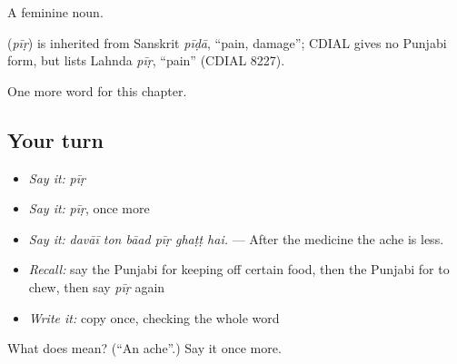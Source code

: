 A feminine noun.

\begin{cousinweb}
\textbf{} (\emph{pīṛ}) is inherited from Sanskrit \emph{pīḍā}, \textquotedblleft{}pain, damage\textquotedblright{}; CDIAL gives no Punjabi form, but lists Lahnda \emph{pīṛ}, \textquotedblleft{}pain\textquotedblright{} (CDIAL 8227).
\end{cousinweb}

\begin{grammarlens}[title={What you've built}]
One more word for this chapter.
\end{grammarlens}

\subsection*{Your turn}
\begin{itemize}
\raggedright
  \item \emph{Say it:} \emph{pīṛ}
  \item \emph{Say it:} \emph{pīṛ}, once more
  \item \emph{Say it:} \emph{davāī ton bāad pīṛ ghaṭṭ hai.} — After the medicine the ache is less.
  \item \emph{Recall:} say the Punjabi for keeping off certain food, then the Punjabi for to chew, then say \emph{pīṛ} again
  \item \emph{Write it:} copy \textbf{} once, checking the whole word
\end{itemize}

\begin{tcolorbox}[breakable,colback=teal!4,colframe=teal!35!black,title={Before you move on}]
What does  mean? (\textquotedblleft{}An ache\textquotedblright{}.) Say it once more.
\end{tcolorbox}
